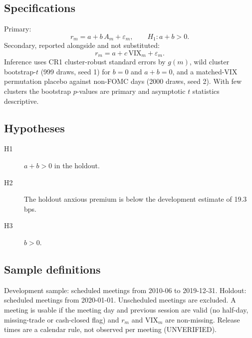 \subsection{Specifications}
Primary:
\begin{equation}
r_m = a + b\,A_m + \varepsilon_m, \qquad H_1: a+b>0 .
\end{equation}
Secondary, reported alongside and not substituted:
\begin{equation}
r_m = a + c\,\mathrm{VIX}_m + \varepsilon_m .
\end{equation}
Inference uses CR1 cluster-robust standard errors by $g(m)$, wild cluster bootstrap-$t$ (999 draws, seed 1) for $b=0$ and $a+b=0$, and a matched-VIX permutation placebo against non-FOMC days (2000 draws, seed 2). With few clusters the bootstrap $p$-values are primary and asymptotic $t$ statistics descriptive.

\subsection{Hypotheses}
\begin{description}
\item[H1] $a+b>0$ in the holdout.
\item[H2] The holdout anxious premium is below the development estimate of 19.3 bps.
\item[H3] $b>0$.
\end{description}

\subsection{Sample definitions}
Development sample: scheduled meetings from 2010-06 to 2019-12-31. Holdout: scheduled meetings from 2020-01-01. Unscheduled meetings are excluded. A meeting is usable if the meeting day and previous session are valid (no half-day, missing-trade or cash-closed flag) and $r_m$ and $\mathrm{VIX}_m$ are non-missing. Release times are a calendar rule, not observed per meeting (UNVERIFIED).



